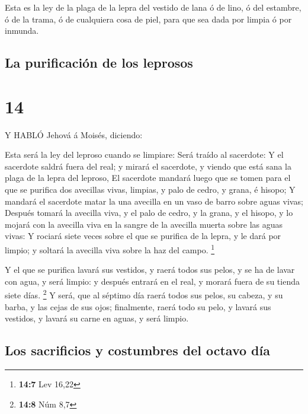  Esta es la ley de la plaga de la lepra del vestido de lana
ó de lino, ó del estambre, ó de la trama, ó de cualquiera cosa de piel,
para que sea dada por limpia ó por inmunda.

\hypertarget{la-purificaciuxf3n-de-los-leprosos}{%
\subsection{La purificación de los
leprosos}\label{la-purificaciuxf3n-de-los-leprosos}}

\hypertarget{section-13}{%
\section{14}\label{section-13}}

 Y HABLÓ Jehová á Moisés, diciendo:

 Esta será la ley del leproso cuando se limpiare: Será
traído al sacerdote:  Y el sacerdote saldrá fuera del real;
y mirará el sacerdote, y viendo que está sana la plaga de la lepra del
leproso,  El sacerdote mandará luego que se tomen para el
que se purifica dos avecillas vivas, limpias, y palo de cedro, y grana,
é hisopo;  Y mandará el sacerdote matar la una avecilla en
un vaso de barro sobre aguas vivas;  Después tomará la
avecilla viva, y el palo de cedro, y la grana, y el hisopo, y lo mojará
con la avecilla viva en la sangre de la avecilla muerta sobre las aguas
vivas:  Y rociará siete veces sobre el que se purifica de la
lepra, y le dará por limpio; y soltará la avecilla viva sobre la haz del
campo. \footnote{\textbf{14:7} Lev 16,22}

 Y el que se purifica lavará sus vestidos, y raerá todos sus
pelos, y se ha de lavar con agua, y será limpio: y después entrará en el
real, y morará fuera de su tienda siete días. \footnote{\textbf{14:8}
  Núm 8,7}  Y será, que al séptimo día raerá todos sus
pelos, su cabeza, y su barba, y las cejas de sus ojos; finalmente, raerá
todo su pelo, y lavará sus vestidos, y lavará su carne en aguas, y será
limpio.

\hypertarget{los-sacrificios-y-costumbres-del-octavo-duxeda}{%
\subsection{Los sacrificios y costumbres del octavo
día}\label{los-sacrificios-y-costumbres-del-octavo-duxeda}}

